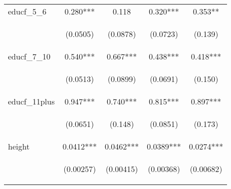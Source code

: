 \documentclass[]{article}
\begin{document}
\begin{center}
\begin{tabular}{lcccc}
educf\_5\_6 & 0.280*** & 0.118 & 0.320*** & 0.353** \\
\vspace{4pt} & \begin{footnotesize}(0.0505)\end{footnotesize} & \begin{footnotesize}(0.0878)\end{footnotesize} & \begin{footnotesize}(0.0723)\end{footnotesize} & \begin{footnotesize}(0.139)\end{footnotesize} \\
educf\_7\_10 & 0.540*** & 0.667*** & 0.438*** & 0.418*** \\
\vspace{4pt} & \begin{footnotesize}(0.0513)\end{footnotesize} & \begin{footnotesize}(0.0899)\end{footnotesize} & \begin{footnotesize}(0.0691)\end{footnotesize} & \begin{footnotesize}(0.150)\end{footnotesize} \\
educf\_11plus & 0.947*** & 0.740*** & 0.815*** & 0.897*** \\
\vspace{4pt} & \begin{footnotesize}(0.0651)\end{footnotesize} & \begin{footnotesize}(0.148)\end{footnotesize} & \begin{footnotesize}(0.0851)\end{footnotesize} & \begin{footnotesize}(0.173)\end{footnotesize} \\
height & 0.0412*** & 0.0462*** & 0.0389*** & 0.0274*** \\
\vspace{4pt} & \begin{footnotesize}(0.00257)\end{footnotesize} & \begin{footnotesize}(0.00415)\end{footnotesize} & \begin{footnotesize}(0.00368)\end{footnotesize} & \begin{footnotesize}(0.00682)\end{footnotesize} \\

\end{tabular}
\end{center}
\end{document}
